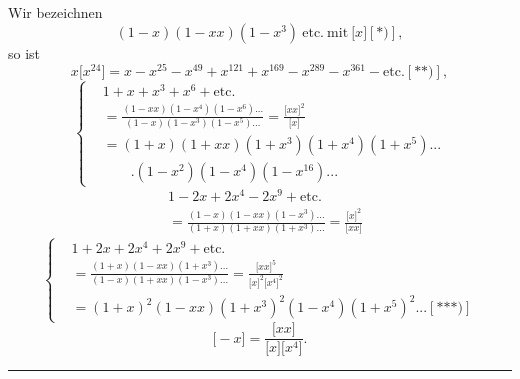 \begingroup
\makeatletter\tagsleft@true\let\veqno\@@leqno\makeatother
\newcommand{\TransBracket}[1]{\boldsymbol{[}#1\boldsymbol{]}}
\newcommand{\TransCrescent}{\tikz[baseline=-.1em,x=.09em,y=.09em]{\draw[line width=.4pt] (5,0) .. controls (-1,0) and (-1,8) .. (5,8) .. controls (0,7.5) and (0,.5) .. (5,0);}}
\noindent{\small[S. 43]}\par
\par\indent Wir bezeichnen
\[(1-x)(1-xx)(1-x^3)\ \text{etc.}\ \text{mit}\ \TransBracket{x}[\text{*)}],\]
\noindent so ist
\[x\TransBracket{x^{24}}=x-x^{25}-x^{49}+x^{121}+x^{169}-x^{289}-x^{361}-\text{etc.}[\text{**)}],\]
\begin{equation*}\tag*{$[2]'$}
\left\{\begin{aligned}
&1+x+x^3+x^6+\text{etc.}\\
&=\frac{(1-xx)(1-x^4)(1-x^6){.}{.}{.}}{(1-x)(1-x^3)(1-x^5){.}{.}{.}}=\frac{\TransBracket{xx}^2}{\TransBracket{x}}\\
&=(1+x)(1+xx)(1+x^3)(1+x^4)(1+x^5){.}{.}{.}\\
&\qquad.(1-x^2)(1-x^4)(1-x^{16}){.}{.}{.}
\end{aligned}\right.
\end{equation*}
\begin{equation*}\tag*{[3]}
\begin{aligned}
&1-2x+2x^4-2x^9+\text{etc.}\\
&=\frac{(1-x)(1-xx)(1-x^3){.}{.}{.}}{(1+x)(1+xx)(1+x^3){.}{.}{.}}=\frac{\TransBracket{x}^2}{\TransBracket{xx}}
\end{aligned}
\end{equation*}
\begin{equation*}\tag*{[4]}
\left\{\begin{aligned}
&1+2x+2x^4+2x^9+\text{etc.}\\
&=\frac{(1+x)(1-xx)(1+x^3){.}{.}{.}}{(1-x)(1+xx)(1-x^3){.}{.}{.}}=\frac{\TransBracket{xx}^5}{\TransBracket{x}^2\TransBracket{x^4}^2}\\
&=(1+x)^2(1-xx)(1+x^3)^2(1-x^4)(1+x^5)^2{.}{.}{.}[\text{***)}]
\end{aligned}\right.
\end{equation*}
\begin{equation*}\tag*{[5]}
\TransBracket{-x}=\frac{\TransBracket{xx}}{\TransBracket{x}\TransBracket{x^4}}.
\end{equation*}
\ClosingRule
{}
\par\smallskip\noindent\rule{.25\linewidth}{.4pt}\par
